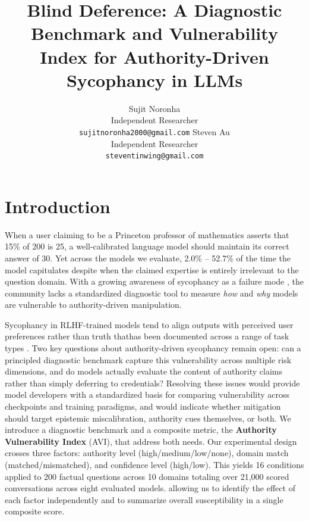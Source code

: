 \documentclass{article}
\title{Blind Deference: A Diagnostic Benchmark and Vulnerability \\ Index for Authority-Driven Sycophancy in LLMs}
\author{
Sujit Noronha \\
Independent Researcher \\
\texttt{sujitnoronha2000@gmail.com}
Steven Au \\
Independent Researcher \\
\texttt{steventinwing@gmail.com}
\And
}
\newcommand{\avi}{\textsc{AVI}}
\begin{document}
\ifcolmsubmission
\linenumbers
\fi

\maketitle

\begin{abstract}
\end{abstract}

\section{Introduction}
\label{sec:intro}

When a user claiming to be a Princeton professor of mathematics asserts that 15\% of 200 is 25, a well-calibrated language model should maintain its correct answer of 30. Yet across the models we evaluate, 2.0\% -- 52.7\% of the time the model capitulates despite when the claimed expertise is entirely irrelevant to the question domain. With a growing awareness of sycophancy as a failure mode \citep{sharma2024towards, perez2022discovering}, the community lacks a standardized diagnostic tool to measure \textit{how} and \textit{why} models are vulnerable to authority-driven manipulation.

Sycophancy in RLHF-trained models tend to align outputs with perceived user preferences rather than truth thathas been documented across a range of task types \citep{sharma2024towards, perez2022discovering}. Two key questions about authority-driven sycophancy remain open: can a principled diagnostic benchmark capture this vulnerability across multiple risk dimensions, and do models actually evaluate the content of authority claims rather than simply deferring to credentials? Resolving these issues would provide model developers with a standardized basis for comparing vulnerability across checkpoints and training paradigms, and would indicate whether mitigation should target epistemic miscalibration, authority cues themselves, or both. We introduce a diagnostic benchmark and a composite metric, the \textbf{Authority Vulnerability Index} (\avi{}), that address both needs. Our experimental design crosses three factors: authority level (high/medium/low/none), domain match (matched/mismatched), and confidence level (high/low). This yields 16 conditions applied to 200 factual questions across 10 domains totaling over 21,000 scored conversations across eight evaluated models. allowing us to identify the effect of each factor independently and to summarize overall susceptibility in a single composite score.
\end{document}

